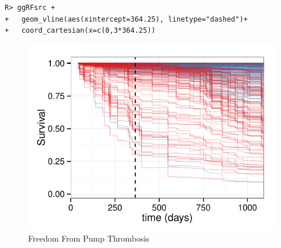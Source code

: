\documentclass[nojss]{jss}\usepackage[]{graphicx}\usepackage[]{color}
\makeatletter
\def\maxwidth{ %
  \ifdim\Gin@nat@width>\linewidth
    \linewidth
  \else
    \Gin@nat@width
  \fi
}
\newenvironment{kframe}{%
 \def\at@end@of@kframe{}%
 \ifinner\ifhmode%
  \def\at@end@of@kframe{\end{minipage}}%
  \begin{minipage}{\columnwidth}%
 \fi\fi%
 \def\FrameCommand##1{\hskip\@totalleftmargin \hskip-\fboxsep
 \colorbox{shadecolor}{##1}\hskip-\fboxsep
     \hskip-\linewidth \hskip-\@totalleftmargin \hskip\columnwidth}%
 \MakeFramed {\advance\hsize-\width
   \@totalleftmargin\z@ \linewidth\hsize
   \@setminipage}}%
 {\par\unskip\endMakeFramed%
 \at@end@of@kframe}
\newenvironment{knitrout}{}{} %
\makeatother
\begin{document}
\begin{knitrout}\footnotesize
{}\color{fgcolor}\begin{kframe}
\begin{verbatim}
R> ggRFsrc +
+   geom_vline(aes(xintercept=364.25), linetype="dashed")+
+   coord_cartesian(x=c(0,3*364.25))
\end{verbatim}
\end{kframe}\begin{figure}[!htpb]

{\centering \includegraphics[width=\maxwidth]{figure/rfs-rfsrc-plot3Mnth-1} 

}

\caption[Freedom From Pump Thrombosis]{Freedom From Pump Thrombosis\label{fig:rfsrc-plot3Mnth}}
\end{figure}


\end{knitrout}
\end{document}
